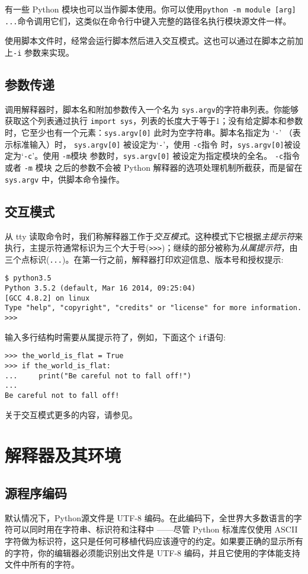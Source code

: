 有一些 Python 模块也可以当作脚本使用。你可以使用\texttt{python -m module [arg] ...}命令调用它们，这类似在命令行中键入完整的路径名执行模块源文件一样。

使用脚本文件时，经常会运行脚本然后进入交互模式。这也可以通过在脚本之前加上\texttt{-i} 参数来实现。
\subsection{参数传递}
调用解释器时，脚本名和附加参数传入一个名为 \texttt{sys.argv}的字符串列表。你能够获取这个列表通过执行 \texttt{import sys}，列表的长度大于等于1；没有给定脚本和参数时，它至少也有一个元素：\texttt{sys.argv[0]} 此时为空字符串。脚本名指定为 ‘\verb|-|’ （表示标准输入）时， \texttt{sys.argv[0]} 被设定为‘\verb|-|’，使用 \texttt{-c}指令 时，\texttt{sys.argv[0]}被设定为‘\verb|-c|’。使用 \texttt{-m}模块 参数时，\texttt{sys.argv[0]} 被设定为指定模块的全名。 \texttt{-c}指令 或者 \texttt{-m} 模块 之后的参数不会被 Python 解释器的选项处理机制所截获，而是留在 \texttt{sys.argv} 中，供脚本命令操作。
\subsection{交互模式}
从 tty 读取命令时，我们称解释器工作于\textit{交互模式}。这种模式下它根据\textit{主提示符}来执行，主提示符通常标识为三个大于号(\verb|>>>|)；继续的部分被称为\textit{从属提示符}，由三个点标识(\verb|...|)。在第一行之前，解释器打印欢迎信息、版本号和授权提示:
\begin{lstlisting}
$ python3.5
Python 3.5.2 (default, Mar 16 2014, 09:25:04)
[GCC 4.8.2] on linux
Type "help", "copyright", "credits" or "license" for more information.
>>>
\end{lstlisting}

输入多行结构时需要从属提示符了，例如，下面这个 \texttt{if}语句:
\begin{lstlisting}
>>> the_world_is_flat = True
>>> if the_world_is_flat:
...     print("Be careful not to fall off!")
...
Be careful not to fall off!
\end{lstlisting}
关于交互模式更多的内容，请参见。
\section{解释器及其环境}
\subsection{源程序编码}
默认情况下，Python源文件是 UTF-8 编码。在此编码下，全世界大多数语言的字符可以同时用在字符串、标识符和注释中 ——尽管 Python 标准库仅使用 ASCII 字符做为标识符，这只是任何可移植代码应该遵守的约定。如果要正确的显示所有的字符，你的编辑器必须能识别出文件是 UTF-8 编码，并且它使用的字体能支持文件中所有的字符。

